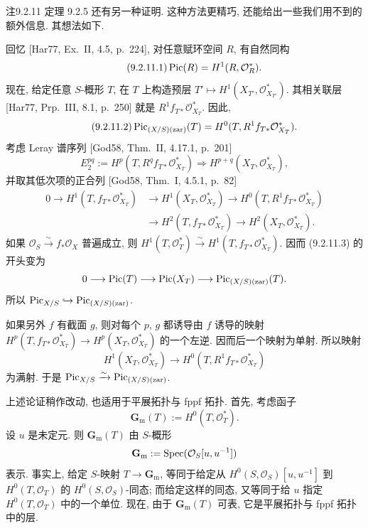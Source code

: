 \begin{origstatement}{注}{9.2.11}\label{ch09s02:rem9211}
定理 9.2.5 还有另一种证明. 这种方法更精巧, 还能给出一些我们用不到的额外信息. 其想法如下.

回忆 [Har77, Ex.~II, 4.5, p.~224], 对任意赋环空间 $R$, 有自然同构
\begin{equation}
\tag{9.2.11.1}\label{ch09s02:eq92111}
\operatorname{Pic}(R)=H^1(R,\mathcal O_R^*).
\end{equation}
现在, 给定任意 $S$-概形 $T$, 在 $T$ 上构造预层 $T'\mapsto H^1(X_{T'},\mathcal O_{X_{T'}}^*)$. 其相关联层 [Har77, Prp.~III, 8.1, p.~250] 就是 $R^1f_{T*}\mathcal O_{X_T}^*$. 因此,
\begin{equation}
\tag{9.2.11.2}\label{ch09s02:eq92112}
\operatorname{Pic}_{(X/S)(\mathrm{zar})}(T)=H^0(T,R^1f_{T*}\mathcal O_{X_T}^*).
\end{equation}
考虑 Leray 谱序列 [God58, Thm.~II, 4.17.1, p.~201]
\[
E_2^{pq}:=H^p(T,R^qf_{T*}\mathcal O_{X_T}^*)\Longrightarrow H^{p+q}(X_T,\mathcal O_{X_T}^*),
\]
并取其低次项的正合列 [God58, Thm.~I, 4.5.1, p.~82]
\begin{equation}
\tag{9.2.11.3}\label{ch09s02:eq92113}
\begin{aligned}
0\longrightarrow H^1(T,f_{T*}\mathcal O_{X_T}^*)
&\longrightarrow H^1(X_T,\mathcal O_{X_T}^*)
\longrightarrow H^0(T,R^1f_{T*}\mathcal O_{X_T}^*)\\
&\longrightarrow H^2(T,f_{T*}\mathcal O_{X_T}^*)
\longrightarrow H^2(X_T,\mathcal O_{X_T}^*).
\end{aligned}
\end{equation}
如果 $\mathcal O_S\xrightarrow{\sim}f_*\mathcal O_X$ 普遍成立, 则 $H^1(T,\mathcal O_T^*)\xrightarrow{\sim}H^1(T,f_{T*}\mathcal O_{X_T}^*)$. 因而 (9.2.11.3) 的开头变为
\[
0\longrightarrow\operatorname{Pic}(T)\longrightarrow\operatorname{Pic}(X_T)\longrightarrow\operatorname{Pic}_{(X/S)(\mathrm{zar})}(T).
\]
所以 $\operatorname{Pic}_{X/S}\hookrightarrow\operatorname{Pic}_{(X/S)(\mathrm{zar})}$.

如果另外 $f$ 有截面 $g$, 则对每个 $p$, $g$ 都诱导由 $f$ 诱导的映射 $H^p(T,f_{T*}\mathcal O_{X_T}^*)\to H^p(X_T,\mathcal O_{X_T}^*)$ 的一个左逆. 因而后一个映射为单射. 所以映射
\[
H^1(X_T,\mathcal O_{X_T}^*)\longrightarrow H^0(T,R^1f_{T*}\mathcal O_{X_T}^*)
\]
为满射. 于是 $\operatorname{Pic}_{X/S}\xrightarrow{\sim}\operatorname{Pic}_{(X/S)(\mathrm{zar})}$.

上述论证稍作改动, 也适用于平展拓扑与 fppf 拓扑. 首先, 考虑函子
\[
\mathbf G_{\mathrm m}(T):=H^0(T,\mathcal O_T^*).
\]
设 $u$ 是未定元. 则 $\mathbf G_{\mathrm m}(T)$ 由 $S$-概形
\[
\mathbf G_{\mathrm m}:=\operatorname{Spec}(\mathcal O_S[u,u^{-1}])
\]
表示. 事实上, 给定 $S$-映射 $T\to\mathbf G_{\mathrm m}$, 等同于给定从 $H^0(S,\mathcal O_S)[u,u^{-1}]$ 到 $H^0(T,\mathcal O_T)$ 的 $H^0(S,\mathcal O_S)$-同态; 而给定这样的同态, 又等同于给 $u$ 指定 $H^0(T,\mathcal O_T)$ 中的一个单位. 现在, 由于 $\mathbf G_{\mathrm m}(T)$ 可表, 它是平展拓扑与 fppf 拓扑中的层.


\end{origstatement}
